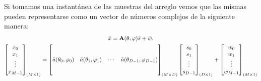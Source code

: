 Si tomamos una instantánea de las muestras del arreglo vemos que las mismas pueden representarse como un vector de números complejos de la siguiente manera:
\begin{gather*}
    \bar{x}=\mathbf{A}(\theta,\varphi)\bar{s}+\bar{w},\\
    \begin{bmatrix}
        x_0    \\
        x_1    \\
        \vdots \\
        x_{M-1}
    \end{bmatrix}_{(M\times 1)} = \begin{bmatrix}
        \vphantom{\begin{bmatrix}
                x_0    \\
                x_1    \\
                \vdots \\
                x_{M-1}
            \end{bmatrix}} \bar{a}(\theta_0,\varphi_0) & \bar{a}(\theta_1,\varphi_1) & \cdots & \bar{a}(\theta_{D-1},\varphi_{D-1})
    \end{bmatrix}_{(M\times D)}
    \begin{bmatrix}
        s_0    \\
        s_1    \\
        \vdots \\
        s_{D-1}
    \end{bmatrix}_{(D\times 1)} +
    \begin{bmatrix}
        w_0    \\
        w_1    \\
        \vdots \\
        w_{M-1}
    \end{bmatrix}_{(M\times 1)}
\end{gather*}

